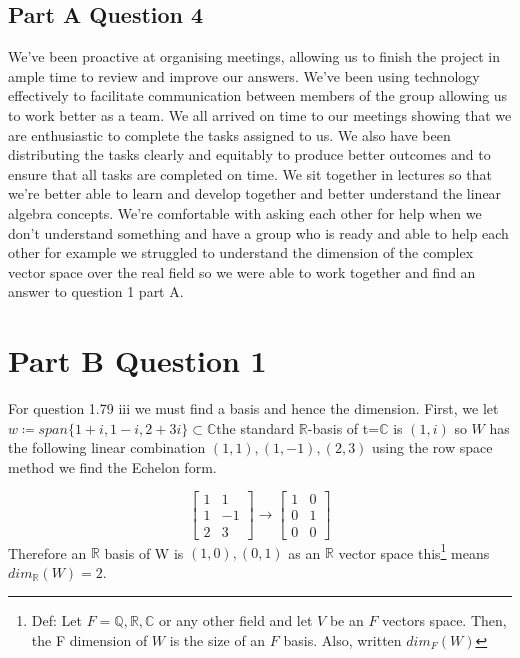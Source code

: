 \documentclass{article}
\begin{document}
\subsection*{Part A Question 4}
We've been proactive at organising meetings, allowing us to finish the project in ample time to review and improve our answers. We've been using technology effectively to facilitate communication between members of the group allowing us to work better as a team. We all arrived on time to our meetings showing that we are enthusiastic to complete the tasks assigned to us. We also have been distributing the tasks clearly and equitably to produce better outcomes and to ensure that all tasks are completed on time. We sit together in lectures so that we're better able to learn and develop together and better understand the linear algebra concepts. We're comfortable with asking each other for help when we don't understand something and have a group who is ready and able to help each other for example we struggled to understand the dimension of the complex vector space over the real field so we were able to work together and find an answer to question 1 part A.

\break

\section{Part B Question 1}
For question 1.79 iii we must find a basis and hence the dimension. First, we let $w \coloneqq span\{ 1+i, 1-i, 2+3i \} \subset \mathbb{C}$the standard $\mathbb{R}$-basis of t=$\mathbb{C}$ is $(1,i)$ so $W$ has the following linear combination $(1,1), (1, -1 ), ( 2, 3)$ using the row space method we find the Echelon form.

\begin{equation*}
    \begin{bmatrix}
        1 & 1 \\ 1 & -1 \\ 2 & 3
    \end{bmatrix}
    \rightarrow
    \begin{bmatrix}
        1 & 0 \\ 0 & 1 \\ 0 & 0
    \end{bmatrix}
\end{equation*}
Therefore an $\mathbb{R}$ basis of W is $( 1, 0 ), (0,1)$ as an $\mathbb{R}$ vector space this\footnote{Def: Let $F = \mathbb{Q}, \mathbb{R}, \mathbb{C}$ or any other field and let $V$ be an $F$ vectors space. Then, the F dimension of $W$ is the size of an $F$ basis. Also, written $dim_{F}(W)$} means $dim_{\mathbb{R}}(W) = 2$.
\end{document}
